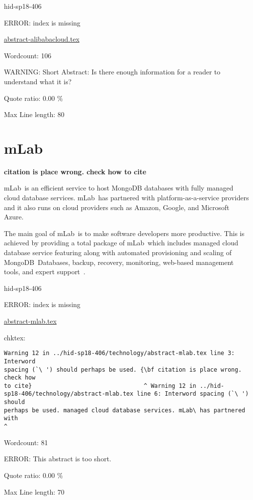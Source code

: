 \begin{IU}

hid-sp18-406

ERROR: index is missing

\href{https://github.com/cloudmesh-community/hid-sp18-406/blob/master//technology/abstract-alibabacloud.tex}{abstract-alibabacloud.tex}

 

Wordcount: 106

WARNING: Short Abstract: Is there enough information for a reader to understand what it is?


Quote ratio: 0.00 \%
 
Max Line length: 80
\end{IU}

\section{mLab}

{\bf citation is place wrong. check how to cite}

mLab\ is an efficient service to host MongoDB databases with fully
managed cloud database services. mLab\ has partnered with
platform-as-a-service providers and it also runs on cloud providers
such as Amazon, Google, and Microsoft Azure.

The main goal of mLab\ is to make software developers more productive.
This is achieved by providing a total package of mLab\ which includes
managed cloud database service featuring along with automated
provisioning and scaling of MongoDB\ Databases, backup, recovery,
monitoring, web-based management tools, and expert
support~\cite{hid-sp18-406-mLab}.


\begin{IU}

hid-sp18-406

ERROR: index is missing

\href{https://github.com/cloudmesh-community/hid-sp18-406/blob/master//technology/abstract-mlab.tex}{abstract-mlab.tex}

 
chktex:
\begin{tiny}
\begin{verbatim}
Warning 12 in ../hid-sp18-406/technology/abstract-mlab.tex line 3: Interword
spacing (`\ ') should perhaps be used. {\bf citation is place wrong. check how
to cite}                                ^ Warning 12 in ../hid-
sp18-406/technology/abstract-mlab.tex line 6: Interword spacing (`\ ') should
perhaps be used. managed cloud database services. mLab\ has partnered with
^
\end{verbatim}
\end{tiny}

Wordcount: 81

ERROR: This abstract is too short.


Quote ratio: 0.00 \%
 
Max Line length: 70
\end{IU}

